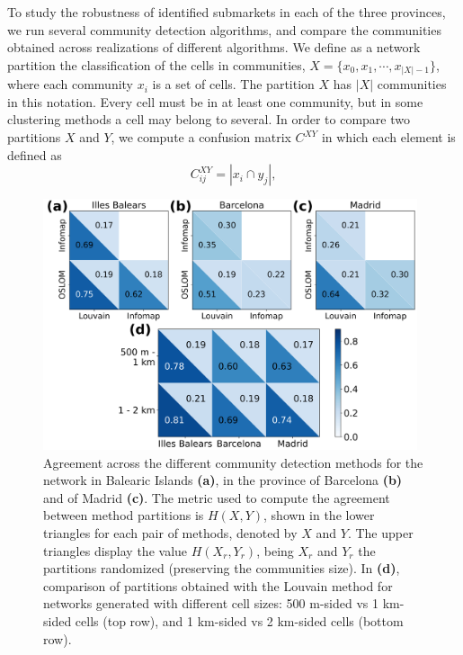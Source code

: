 To study the robustness of identified submarkets in each of the three provinces, we run several community detection algorithms, and compare the communities obtained across realizations of different algorithms. We define as a network partition the classification of the cells in communities, $X = \{x_0, x_1, \cdots , x_{|X|-1} \}$, where each community $x_i$ is a set of cells. The partition $X$ has $|X|$ communities in this notation. Every cell must be in at least one community, but in some clustering methods a cell may belong to several.
In order to compare two partitions $X$ and $Y$, we compute a confusion matrix $C^{XY}$ in which each element is defined as
\begin{equation}
    C^{XY}_{ij} = | x_i \cap y_j | ,
\end{equation}
\begin{figure}[ht]
    \label{fig:agreement_scale_method}
    \centering
    \includegraphics[width = 0.98\textwidth]{Figs/Idealista_segmentation/Agreement_method_scale.pdf}
	\caption[Agreement across three methods and cell sizes.]{ Agreement across the different community detection methods for the network in Balearic Islands \textbf{(a)}, in the province of Barcelona \textbf{(b)} and of Madrid \textbf{(c)}. The metric used to compute the agreement between method partitions is $H(X,Y)$, shown in the lower triangles for each pair of methods, denoted by $X$ and $Y$. The upper triangles display the value $H(X_r,Y_r)$, being $X_r$ and $Y_r$ the partitions randomized (preserving the communities size). In \textbf{(d)}, comparison of partitions obtained with the Louvain method for networks generated with different cell sizes: 500 m-sided vs  1 km-sided cells (top row), and 1 km-sided vs 2 km-sided cells (bottom row). }
\end{figure}
